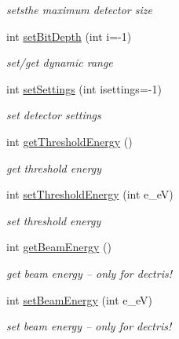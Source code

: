 \begin{CompactItemize}
\begin{CompactList}\small\item\em setsthe maximum detector size \item\end{CompactList}\item 
int \hyperlink{classslsDetectorUsers_ff667cf0665154cdff5d5f3dbc3526ba}{set\-Bit\-Depth} (int i=-1)
\begin{CompactList}\small\item\em set/get dynamic range \item\end{CompactList}\item 
int \hyperlink{classslsDetectorUsers_31b25d2659d3b244bb10b5516a9fd957}{set\-Settings} (int isettings=-1)
\begin{CompactList}\small\item\em set detector settings \item\end{CompactList}\item 
int \hyperlink{classslsDetectorUsers_fe8029788742125c44383817f89214ca}{get\-Threshold\-Energy} ()
\begin{CompactList}\small\item\em get threshold energy \item\end{CompactList}\item 
int \hyperlink{classslsDetectorUsers_1354266fd1bfaccd58992a3f51bbbd1d}{set\-Threshold\-Energy} (int e\_\-e\-V)
\begin{CompactList}\small\item\em set threshold energy \item\end{CompactList}\item 
int \hyperlink{classslsDetectorUsers_c9ea028f75a180534c8d00eeea0727d3}{get\-Beam\-Energy} ()
\begin{CompactList}\small\item\em get beam energy -- only for dectris! \item\end{CompactList}\item 
int \hyperlink{classslsDetectorUsers_475938986407804877df4dcece97cc19}{set\-Beam\-Energy} (int e\_\-e\-V)
\begin{CompactList}\small\item\em set beam energy -- only for dectris! \item\end{CompactList}\item 

\end{CompactItemize}
